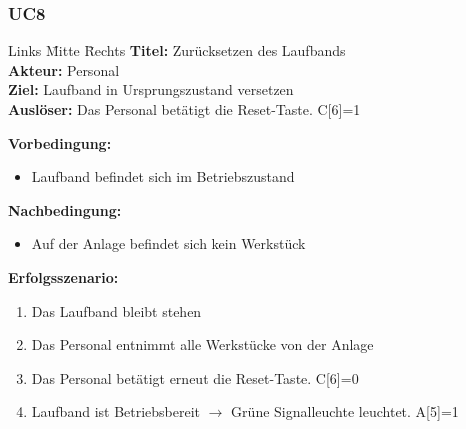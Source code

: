 \documentclass[oneside,a4paper,titlepage]{scrartcl} %
\begin{document}
\newpage

\subsubsection{UC8}
\begin{tabbing}
 Links \= Mitte \= Rechts \kill
 \textbf{Titel:} \> \> Zurücksetzen des Laufbands\\
 \textbf{Akteur:} \> \> Personal\\
 \textbf{Ziel:} \> \> Laufband in Ursprungszustand versetzen\\
 \textbf{Auslöser:} \> \> Das Personal betätigt die Reset-Taste. C[6]=1\\
\end{tabbing}
\textbf{Vorbedingung:}
\begin{itemize}
 \item Laufband befindet sich im Betriebszustand
\end{itemize}
\textbf{Nachbedingung:}
\begin{itemize}
 \item Auf der Anlage befindet sich kein Werkstück
\end{itemize}
\textbf{Erfolgsszenario:}
\begin{enumerate}
 \item Das Laufband bleibt stehen
 \item Das Personal entnimmt alle Werkstücke von der Anlage
 \item Das Personal betätigt erneut die Reset-Taste. C[6]=0
 \item Laufband ist Betriebsbereit $\rightarrow$ Grüne Signalleuchte leuchtet. A[5]=1
\end{enumerate}
\end{document}
